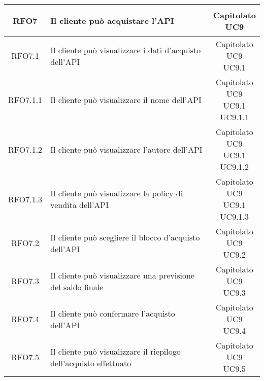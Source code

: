 \begin{longtable}{|c|p{8cm}|c|}
\hypertarget{RFO7}{RFO7} & Il cliente può acquistare l'API & \makecell*{Capitolato\\UC9} \\
\hline

\hypertarget{RFO7.1}{RFO7.1} & Il cliente può visualizzare i dati d'acquisto dell'API & \makecell*{Capitolato\\UC9\\UC9.1} \\
\hline

\hypertarget{RFO7.1.1}{RFO7.1.1} & Il cliente può visualizzare il nome dell'API & \makecell*{Capitolato\\UC9\\UC9.1\\UC9.1.1} \\
\hline
\hypertarget{RFO7.1.2}{RFO7.1.2} & Il cliente può visualizzare l'autore dell'API & \makecell*{Capitolato\\UC9\\UC9.1\\UC9.1.2} \\
\hline
\hypertarget{RFO7.1.3}{RFO7.1.3} & Il cliente può visualizzare la policy di vendita dell'API & \makecell*{Capitolato\\UC9\\UC9.1\\UC9.1.3} \\
\hline

\hypertarget{RFO7.2}{RFO7.2} & Il cliente può scegliere il blocco d'acquisto dell'API & \makecell*{Capitolato\\UC9\\UC9.2} \\
\hline
\hypertarget{RFO7.3}{RFO7.3} & Il cliente può visualizzare una previsione del saldo finale & \makecell*{Capitolato\\UC9\\UC9.3} \\
\hline

\hypertarget{RFO7.4}{RFO7.4} & Il cliente può confermare l'acquisto dell'API & \makecell*{Capitolato\\UC9\\UC9.4} \\
\hline

\hypertarget{RFO7.5}{RFO7.5} & Il cliente può visualizzare il riepilogo dell'acquisto effettuato & \makecell*{Capitolato\\UC9\\UC9.5} \\
\hline


\end{longtable}
